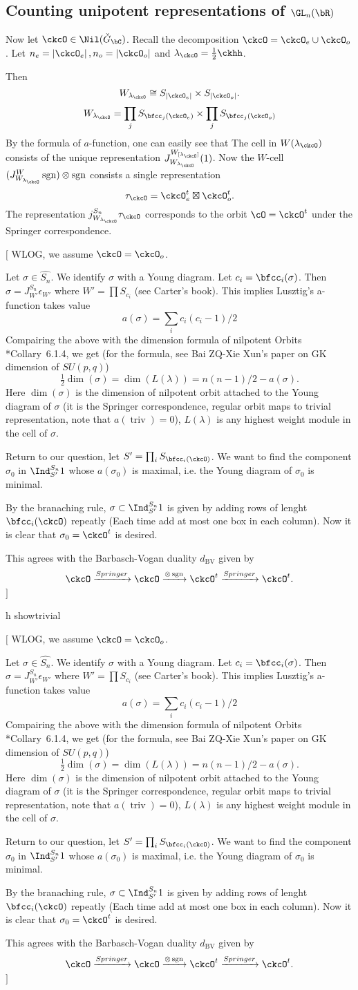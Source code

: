 \documentclass[12pt,a4paper]{amsart}
\newcommand{\trivial}[2][]{\if\relax\detokenize{#1}\relax
  {%
      \color{orange} \vspace{0em} $[$  #2 $]$
      \color{black}
  }
  \else
\ifx#1h
\ifcsname showtrivial\endcsname
{%
    \color{orange} \vspace{0em}  $[$ #2 $]$
    \color{black}
}
\fi
\else {\red Wrong argument!} \fi
\fi
}
\def\abs#1{\left|{#1}\right|}
\newcommand{\sgn}{\operatorname{sgn}}
\newcommand{\triv}{\operatorname{triv}}
\numberwithin{equation}{section}
\theoremstyle{remark}
\def\half{{\tfrac{1}{2}}}
\def\ckGc{\check{G}_{\bC}}
\def\dBV{d_{\mathrm{BV}}}
\def\lamck{\lambda_\ckcO}
\def\Wint#1{W_{[#1]}}
\begin{document}
\subsection{Counting unipotent representations of $\GL_n(\bR)$}
Now let $\ckcO\in \Nil(\ckGc)$. 
Recall the decomposition $\ckcO  = \ckcO_e \cup \ckcO_o$.
Let $n_e = \abs{\ckcO_e}, n_o = \abs{\ckcO_o}$ and $\lambda_\ckcO = \half \ckhh$. 

Then 
\[
  W_{\lamck} \cong S_{\abs{\ckcO_e}}\times S_{\abs{\ckcO_o}}.
\]
\[
 W_{\lambda_\ckcO} = \prod_j S_{\bfcc_j(\ckcO_e)}\times \prod_j S_{\bfcc_j(\ckcO_o)} 
\]
By the formula of $a$-function, one can easily see that 
The cell in $W(\lamck)$ consists of the unique representation $J_{W_{\lamck}}^{\Wint{\lamck}} (1)$.
Now the $W$-cell $(J_{W_{\lamck}}^W \sgn)\otimes \sgn$ consists a single
representation
\[
\tau_{\ckcO} = \ckcO_{e}^{t}\boxtimes \ckcO_{o}^{t}.
\]
The representation $j_{W_{\lamck}}^{S_{n}} \tau_{\ckcO}$
corresponds to the orbit $\cO= \ckcO^t $ under the Springer
correspondence.
\trivial{
WLOG, we assume $\ckcO =  \ckcO_o$.

Let $\sigma\in \widehat{S_n}$. We identify $\sigma$ with a Young diagram. 
Let $c_i = \bfcc_i(\sigma)$.
Then $\sigma = J^{S_n}_{W'} \epsilon_{W'}$ where $W' = \prod S_{c_i}$
(see Carter's book). 
This implies Lusztig's a-function takes value
\[
a(\sigma) = \sum_i c_i(c_i-1) /2
\]
Compairing the above with the dimension formula of nilpotent Orbits
\cite{CM}*{Collary~6.1.4}, we get (for the formula, see Bai ZQ-Xie Xun's paper on 
GK dimension of $SU(p,q)$)
\[
\half \dim(\sigma) = \dim(L(\lambda)) = n(n-1)/2 - a(\sigma).
\]
Here $\dim(\sigma)$ is the dimension of nilpotent orbit attached to the Young
diagram of $\sigma$ (it is the Springer correspondence, regular orbit maps to
trivial representation, note that $a(\triv)=0$), $L(\lambda)$ is any highest
weight module in the cell of $\sigma$. 


Return to our question, let $S' = \prod_i S_{\bfcc_i(\ckcO)}$. We want to find
the component $\sigma_0$ in $\Ind_{S'}^{S_n} 1$ whose $a(\sigma_0)$ is maximal,
i.e. the Young diagram of $\sigma_0$ is minimal. 

 By the branaching rule, $\sigma \subset \Ind_{S'}^{S_n} 1$ is given by adding
 rows of lenght $\bfcc_i(\ckcO)$ repeatly (Each time add at most one box in each
 column). 
 Now it is clear that $\sigma_0 = \ckcO^t$ is desired. 

 This agrees with the Barbasch-Vogan duality $\dBV$ given by 
 \[
  \ckcO \xrightarrow{Springer}\ckcO \xrightarrow{\otimes \sgn} \ckcO^t 
  \xrightarrow{Springer} \ckcO^t.
 \]
}
\end{document}
